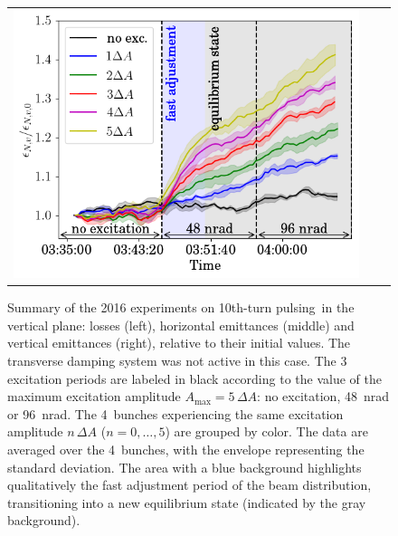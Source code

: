 \documentclass[
prstab
,reprint
,linenumbers
,longbibliography
,preprintnumbers
,showkeys
,amsfonts,amssymb,amsmath
,floatfix
]{revtex4-1}
\newcommand{\tenthtp}{10th-turn pulsing}
\newlength{\thirdwidth}
\begin{document}
\begin{figure}
\begin{tabular}{ccc}
    \includegraphics[width=\thirdwidth]{2016_emitv_avg_rel_v10th_no_damper.png}\\
  \end{tabular}
  \caption{Summary of the 2016 experiments on \tenthtp\ in the
    vertical plane: losses (left), horizontal emittances (middle) and
    vertical emittances (right), relative to their initial values. The
    transverse damping system was not active in this case. The 3
    excitation periods are labeled in black according to the value of
    the maximum excitation amplitude
    $A_{\mathrm{max}} = 5 \, \Delta A$: no excitation, 48~nrad or
    96~nrad. The 4~bunches experiencing the same excitation amplitude
    $n \, \Delta A$ ($n = 0, \ldots, 5$) are grouped by color. The
    data are averaged over the 4~bunches, with the envelope
    representing the standard deviation. The area with a blue
    background highlights qualitatively the fast adjustment period of
    the beam distribution, transitioning into a new equilibrium state
    (indicated by the gray background).}
  \label{fig:10thexp}
\end{figure}
\end{document}
